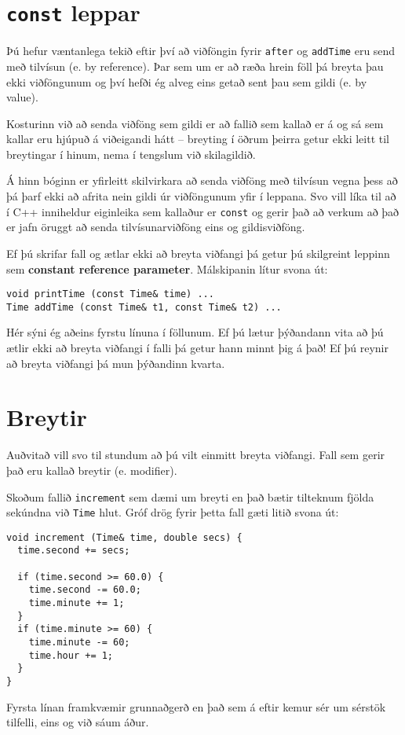 \section{{\tt const} leppar}

Þú hefur væntanlega tekið eftir því að viðföngin fyrir {\tt after}
og {\tt addTime} eru send með tilvísun (e. by reference).
Þar sem um er að ræða hrein föll þá breyta þau ekki viðföngunum og því hefði ég alveg eins getað sent þau sem gildi (e. by value).

Kosturinn við að senda viðföng sem gildi er að fallið sem kallað er á og sá sem kallar eru hjúpuð á viðeigandi hátt -- breyting í öðrum þeirra getur ekki leitt til breytingar í hinum, nema í tengslum við skilagildið.

Á hinn bóginn er yfirleitt skilvirkara að senda viðföng með tilvísun vegna þess að þá þarf ekki að afrita nein gildi úr viðföngunum yfir í leppana.
Svo vill líka til að í C++ inniheldur eiginleika sem kallaður er {\tt const} og gerir það að verkum að það er jafn öruggt að senda tilvísunarviðföng eins og gildisviðföng.

Ef þú skrifar fall og ætlar ekki að breyta viðfangi þá getur þú skilgreint leppinn sem {\bf constant reference parameter}.
Málskipanin lítur svona út:

\begin{verbatim}
void printTime (const Time& time) ...
Time addTime (const Time& t1, const Time& t2) ...
\end{verbatim}
%
Hér sýni ég aðeins fyrstu línuna í föllunum.
Ef þú lætur þýðandann vita að þú ætlir ekki að breyta viðfangi í falli þá getur hann minnt þig á það!
Ef þú reynir að breyta viðfangi þá mun þýðandinn kvarta.


\section{Breytir}

Auðvitað vill svo til stundum að þú vilt einmitt breyta viðfangi.  Fall sem gerir það eru kallað breytir (e. modifier).

Skoðum fallið {\tt increment} sem dæmi um breyti en það bætir tilteknum fjölda sekúndna við {\tt Time} hlut.
Gróf drög fyrir þetta fall gæti litið svona út:

\begin{verbatim}
void increment (Time& time, double secs) {
  time.second += secs;

  if (time.second >= 60.0) {
    time.second -= 60.0;
    time.minute += 1;
  }
  if (time.minute >= 60) {
    time.minute -= 60;
    time.hour += 1;
  }
}
\end{verbatim}
%
Fyrsta línan framkvæmir grunnaðgerð en það sem á eftir kemur sér um sérstök tilfelli, eins og við sáum áður.

